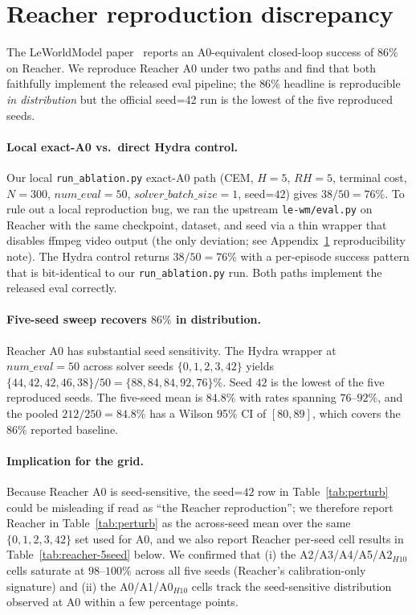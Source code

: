 \documentclass{article}
\begin{document}
\section{Reacher reproduction discrepancy}
\label{app:reacher}

The LeWorldModel paper~\cite{maes2026leworldmodel} reports an A0-equivalent closed-loop success of $86\%$ on Reacher. We reproduce Reacher A0 under two paths and find that both faithfully implement the released eval pipeline; the $86\%$ headline is reproducible \emph{in distribution} but the official seed=42 run is the lowest of the five reproduced seeds.

\paragraph{Local exact-A0 vs.\ direct Hydra control.} Our local \texttt{run\_ablation.py} exact-A0 path (CEM, $H{=}5$, $RH{=}5$, terminal cost, $N{=}300$, $\mathit{num\_eval}{=}50$, $\mathit{solver\_batch\_size}=1$, seed=$42$) gives $38/50 = 76\%$. To rule out a local reproduction bug, we ran the upstream \texttt{le-wm/eval.py} on Reacher with the same checkpoint, dataset, and seed via a thin wrapper that disables ffmpeg video output (the only deviation; see Appendix~\ref{app:reacher} reproducibility note). The Hydra control returns $38/50 = 76\%$ with a per-episode success pattern that is bit-identical to our \texttt{run\_ablation.py} run. Both paths implement the released eval correctly.

\paragraph{Five-seed sweep recovers $86\%$ in distribution.} Reacher A0 has substantial seed sensitivity. The Hydra wrapper at $\mathit{num\_eval}{=}50$ across solver seeds $\{0, 1, 2, 3, 42\}$ yields $\{44, 42, 42, 46, 38\}/50 = \{88, 84, 84, 92, 76\}\%$. Seed $42$ is the lowest of the five reproduced seeds. The five-seed mean is $84.8\%$ with rates spanning $76$--$92\%$, and the pooled $212/250 = 84.8\%$ has a Wilson 95\% CI of $[80, 89]$, which covers the $86\%$ reported baseline.

\paragraph{Implication for the grid.} Because Reacher A0 is seed-sensitive, the seed=$42$ row in Table~\ref{tab:perturb} could be misleading if read as ``the Reacher reproduction''; we therefore report Reacher in Table~\ref{tab:perturb} as the across-seed mean over the same $\{0, 1, 2, 3, 42\}$ set used for A0, and we also report Reacher per-seed cell results in Table~\ref{tab:reacher-5seed} below. We confirmed that (i) the A2/A3/A4/A5/A2$_{H10}$ cells saturate at $98$--$100\%$ across all five seeds (Reacher's calibration-only signature) and (ii) the A0/A1/A0$_{H10}$ cells track the seed-sensitive distribution observed at A0 within a few percentage points.
\end{document}
